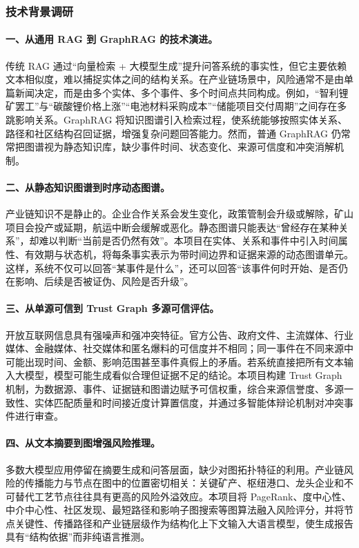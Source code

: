 \documentclass[12pt,a4paper]{article}
\begin{document}
\subsubsection{技术背景调研}

\paragraph{一、从通用 RAG 到 GraphRAG 的技术演进。}传统 RAG 通过“向量检索 + 大模型生成”提升问答系统的事实性，但它主要依赖文本相似度，难以捕捉实体之间的结构关系。在产业链场景中，风险通常不是由单篇新闻决定，而是由多个实体、多个事件、多个时间点共同构成。例如，“智利锂矿罢工”与“碳酸锂价格上涨”“电池材料采购成本”“储能项目交付周期”之间存在多跳影响关系。GraphRAG 将知识图谱引入检索过程，使系统能够按照实体关系、路径和社区结构召回证据，增强复杂问题回答能力。然而，普通 GraphRAG 仍常常把图谱视为静态知识库，缺少事件时间、状态变化、来源可信度和冲突消解机制。

\paragraph{二、从静态知识图谱到时序动态图谱。}产业链知识不是静止的。企业合作关系会发生变化，政策管制会升级或解除，矿山项目会投产或延期，航运中断会缓解或恶化。静态图谱只能表达“曾经存在某种关系”，却难以判断“当前是否仍然有效”。本项目在实体、关系和事件中引入时间属性、有效期与状态机，将每条事实表示为带时间边界和证据来源的动态图谱单元。这样，系统不仅可以回答“某事件是什么”，还可以回答“该事件何时开始、是否仍在影响、后续是否被证伪、风险是否升级”。

\paragraph{三、从单源可信到 Trust Graph 多源可信评估。}开放互联网信息具有强噪声和强冲突特征。官方公告、政府文件、主流媒体、行业媒体、金融媒体、社交媒体和匿名爆料的可信度并不相同；同一事件在不同来源中可能出现时间、金额、影响范围甚至事件真假上的矛盾。若系统直接把所有文本输入大模型，模型可能生成看似合理但证据不足的结论。本项目构建 Trust Graph 机制，为数据源、事件、证据链和图谱边赋予可信权重，综合来源信誉度、多源一致性、实体匹配质量和时间接近度计算置信度，并通过多智能体辩论机制对冲突事件进行审查。

\paragraph{四、从文本摘要到图增强风险推理。}多数大模型应用停留在摘要生成和问答层面，缺少对图拓扑特征的利用。产业链风险的传播能力与节点在图中的位置密切相关：关键矿产、枢纽港口、龙头企业和不可替代工艺节点往往具有更高的风险外溢效应。本项目将 PageRank、度中心性、中介中心性、社区发现、最短路径和影响子图搜索等图算法融入风险评分，并将节点关键性、传播路径和产业链层级作为结构化上下文输入大语言模型，使生成报告具有“结构依据”而非纯语言推测。
\end{document}
